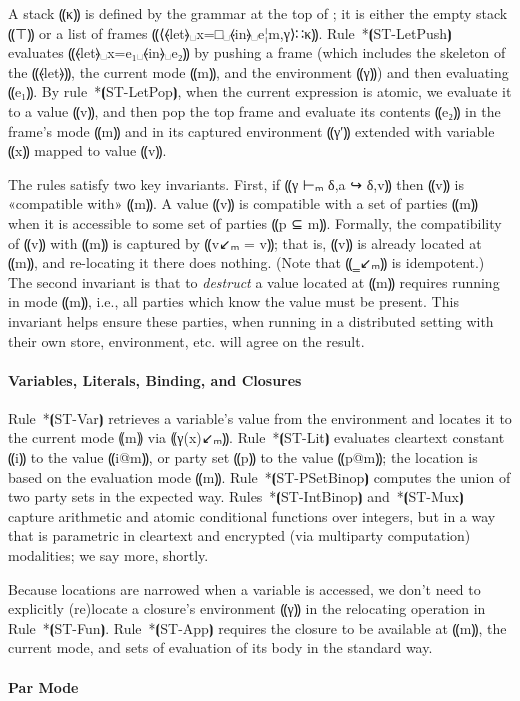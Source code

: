 A stack ⸨κ⸩ is defined by the grammar at the top of
; it is either the empty stack ⸨⊤⸩ or a
list of frames ⸨⟨⦑let⦒␣x=□␣⦑in⦒␣e¦m,γ⟩∷κ⸩. Rule~*⦗ST-LetPush⦘ evaluates
⸨⦑let⦒␣x=e₁␣⦑in⦒␣e₂⸩ by pushing a frame (which includes the skeleton of the
⸨⦑let⦒⸩, the current mode ⸨m⸩, and the environment ⸨γ⸩) and then evaluating
⸨e₁⸩. By rule~*⦗ST-LetPop⦘, when the current expression is atomic, we
evaluate it to a value ⸨v⸩, and then pop the top frame and evaluate its
contents ⸨e₂⸩ in the frame's mode ⸨m⸩ and in its captured environment ⸨γ′⸩
extended with variable ⸨x⸩ mapped to value ⸨v⸩.

The rules satisfy two key invariants. First, if ⸨γ ⊢ₘ δ,a ↪ δ,v⸩ then ⸨v⸩ is «compatible
with» ⸨m⸩. A value ⸨v⸩ is compatible with a set of parties ⸨m⸩ when it is
accessible to some set of parties ⸨p ⊆ m⸩. Formally, the compatibility of ⸨v⸩
with ⸨m⸩ is captured by ⸨v↙ₘ = v⸩; that is, ⸨v⸩ is already located at ⸨m⸩, and
re-locating it there does nothing. (Note that ⸨‗↙ₘ⸩ is idempotent.)
The second invariant is that to \emph{destruct} a value located at ⸨m⸩
requires running in mode ⸨m⸩, i.e., all parties which know the value must be
present. This invariant helps ensure these parties, when running in a
distributed setting with their own store, environment, etc. will agree on the
result.

\paragraph*{Variables, Literals, Binding, and Closures}

Rule~*⦗ST-Var⦘ retrieves a variable's value from the environment and
locates it to the current mode ⸨m⸩ via ⸨γ(x)↙ₘ⸩. Rule~*⦗ST-Lit⦘ evaluates
cleartext constant ⸨i⸩ to the value ⸨i@m⸩, or party set ⸨p⸩ to the value ⸨p@m⸩;
the location is based on the evaluation mode ⸨m⸩.  Rule~*⦗ST-PSetBinop⦘ computes
the union of two party sets in the expected way. Rules~*⦗ST-IntBinop⦘
and~*⦗ST-Mux⦘ capture arithmetic and atomic conditional functions over integers,
but in a way that is parametric in cleartext and encrypted (via multiparty
computation) modalities; we say more, shortly.

Because locations are narrowed when a variable is accessed, we don't need to
explicitly (re)locate a closure's environment ⸨γ⸩ in the relocating
operation in Rule~*⦗ST-Fun⦘. Rule~*⦗ST-App⦘ requires the closure to be available at ⸨m⸩,
the current mode, and sets of evaluation of its body in the standard way.

\paragraph*{Par Mode}

